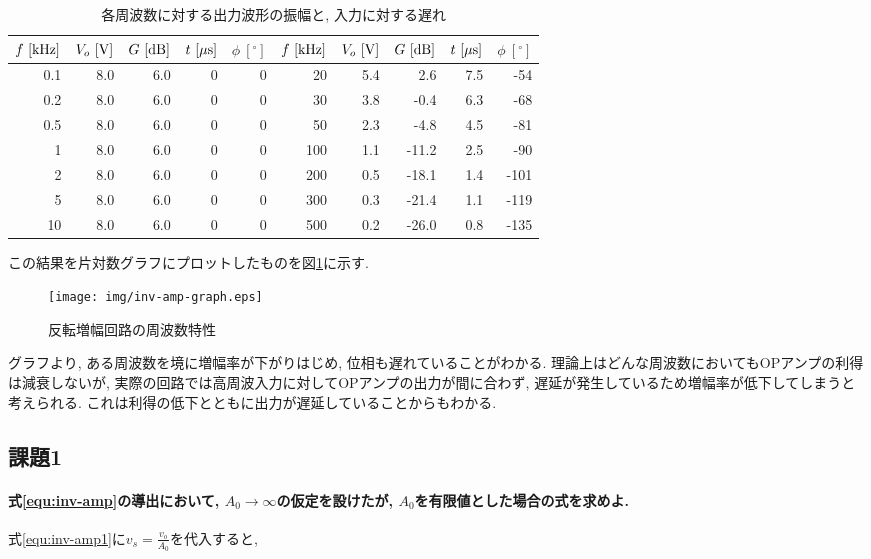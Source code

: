 \documentclass[titlepage]{jsarticle}
\begin{document}
        \begin{table}[h]
            \caption{各周波数に対する出力波形の振幅と, 入力に対する遅れ}
            \label{tab:inv-amp}
            \centering
            \begin{tabular}{r|rr|rr||r|rr|rr}
                $f \ [\rm{kHz}]$ & $V_o \ [\rm{V]}$ & $G \ [\rm{dB}]$ & $t \ [\mu\rm{s}]$ & $\phi \ [^\circ]$ & $f \ [\rm{kHz}]$ & $V_o \ [\rm{V]}$ & $G \ [\rm{dB}]$ & $t \ [\mu\rm{s}]$ & $\phi \ [^\circ]$ \\ \hline \hline
                0.1 & 8.0 & 6.0 & 0 & 0 & 20 & 5.4 & 2.6 & 7.5 & -54 \\
                0.2 & 8.0 & 6.0 & 0 & 0 & 30 & 3.8 & -0.4 & 6.3 & -68 \\
                0.5 & 8.0 & 6.0 & 0 & 0 & 50 & 2.3 & -4.8 & 4.5 & -81 \\
                1 & 8.0 & 6.0 & 0 & 0 & 100 & 1.1 & -11.2 & 2.5 & -90 \\
                2 & 8.0 & 6.0 & 0 & 0 & 200 & 0.5 & -18.1 & 1.4 & -101 \\
                5 & 8.0 & 6.0 & 0 & 0 & 300 & 0.3 & -21.4 & 1.1 & -119 \\
                10 & 8.0 & 6.0 & 0 & 0 & 500 & 0.2 & -26.0 & 0.8 & -135 \\
            \end{tabular}
        \end{table}

        この結果を片対数グラフにプロットしたものを図\ref{fig:inv-amp-graph}に示す.

        \begin{figure}[h]
            \centering
            \texttt{[image: img/inv-amp-graph.eps]}
            \caption{反転増幅回路の周波数特性}
            \label{fig:inv-amp-graph}
        \end{figure}

        グラフより,
        ある周波数を境に増幅率が下がりはじめ,
        位相も遅れていることがわかる.
        理論上はどんな周波数においてもOPアンプの利得は減衰しないが,
        実際の回路では高周波入力に対してOPアンプの出力が間に合わず,
        遅延が発生しているため増幅率が低下してしまうと考えられる.
        これは利得の低下とともに出力が遅延していることからもわかる.

    \subsection{課題1}
        \paragraph{
            式\ref{equ:inv-amp}の導出において,
            $A_0 \rightarrow \infty$の仮定を設けたが,
            $A_0$を有限値とした場合の式を求めよ. \\
        }
            式\ref{equ:inv-amp1}に$\displaystyle v_s = \frac{v_o}{A_0}$を代入すると,
\end{document}
